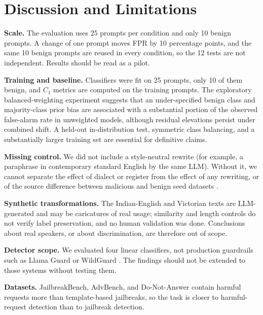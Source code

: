 \documentclass[conference]{IEEEtran}
\begin{document}
\section{Discussion and Limitations}
\label{sec:limitations}
\textbf{Scale.} The evaluation uses 25 prompts per condition and only 10 benign prompts. A change of one prompt moves FPR by 10 percentage points, and the same 10 benign prompts are reused in every condition, so the 12 tests are not independent. Results should be read as a pilot.

\textbf{Training and baseline.} Classifiers were fit on 25 prompts, only 10 of them benign, and $C_1$ metrics are computed on the training prompts. The exploratory balanced-weighting experiment suggests that an under-specified benign class and majority-class prior bias are associated with a substantial portion of the observed false-alarm rate in unweighted models, although residual elevations persist under combined shift. A held-out in-distribution test, symmetric class balancing, and a substantially larger training set are essential for definitive claims.

\textbf{Missing control.} We did not include a style-neutral rewrite (for example, a paraphrase in contemporary standard English by the same LLM). Without it, we cannot separate the effect of dialect or register from the effect of any rewriting, or of the source difference between malicious and benign seed datasets \cite{fomin2026whenbenchmarkslie}.

\textbf{Synthetic transformations.} The Indian-English and Victorian texts are LLM-generated and may be caricatures of real usage; similarity and length controls do not verify label preservation, and no human validation was done. Conclusions about real speakers, or about discrimination, are therefore out of scope.

\textbf{Detector scope.} We evaluated four linear classifiers, not production guardrails such as Llama Guard or WildGuard \cite{han2024wildguard}. The findings should not be extended to those systems without testing them.

\textbf{Datasets.} JailbreakBench, AdvBench, and Do-Not-Answer contain harmful requests more than template-based jailbreaks, so the task is closer to harmful-request detection than to jailbreak detection.
\end{document}
